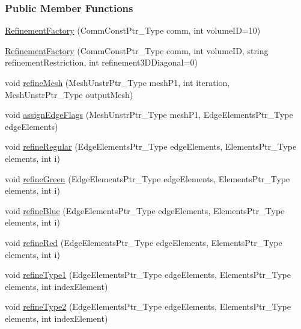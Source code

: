 \subsubsection*{Public Member Functions}
\begin{DoxyCompactItemize}
\item 
\hyperlink{classFEDD_1_1RefinementFactory_a3f60708ffc7693357aa56cf5717c1127}{Refinement\+Factory} (Comm\+Const\+Ptr\+\_\+\+Type comm, int volume\+ID=10)
\item 
\hyperlink{classFEDD_1_1RefinementFactory_a5207ece9582aa02b221b48b89cddfab9}{Refinement\+Factory} (Comm\+Const\+Ptr\+\_\+\+Type comm, int volume\+ID, string refinement\+Restriction, int refinement3\+D\+Diagonal=0)
\item 
void \hyperlink{classFEDD_1_1RefinementFactory_a974e093ee5ef9989bc496392ad5b3c41}{refine\+Mesh} (Mesh\+Unstr\+Ptr\+\_\+\+Type mesh\+P1, int iteration, Mesh\+Unstr\+Ptr\+\_\+\+Type output\+Mesh)
\item 
void \hyperlink{classFEDD_1_1RefinementFactory_aecd11b1eb2352b22948e1440e3b969d2}{assign\+Edge\+Flags} (Mesh\+Unstr\+Ptr\+\_\+\+Type mesh\+P1, Edge\+Elements\+Ptr\+\_\+\+Type edge\+Elements)
\item 
void \hyperlink{classFEDD_1_1RefinementFactory_a34555e97248bb30957744deed34ef317}{refine\+Regular} (Edge\+Elements\+Ptr\+\_\+\+Type edge\+Elements, Elements\+Ptr\+\_\+\+Type elements, int i)
\item 
void \hyperlink{classFEDD_1_1RefinementFactory_a96a9486491ea7d16bfbfaaa5849f794c}{refine\+Green} (Edge\+Elements\+Ptr\+\_\+\+Type edge\+Elements, Elements\+Ptr\+\_\+\+Type elements, int i)
\item 
void \hyperlink{classFEDD_1_1RefinementFactory_a07319ad66d1bcce639f74e12524cfb93}{refine\+Blue} (Edge\+Elements\+Ptr\+\_\+\+Type edge\+Elements, Elements\+Ptr\+\_\+\+Type elements, int i)
\item 
void \hyperlink{classFEDD_1_1RefinementFactory_a0a7da256870f3d9ccdd7801a1ce06a46}{refine\+Red} (Edge\+Elements\+Ptr\+\_\+\+Type edge\+Elements, Elements\+Ptr\+\_\+\+Type elements, int i)
\item 
void \hyperlink{classFEDD_1_1RefinementFactory_ad6cec217483b91da00bf36d35b05e312}{refine\+Type1} (Edge\+Elements\+Ptr\+\_\+\+Type edge\+Elements, Elements\+Ptr\+\_\+\+Type elements, int index\+Element)
\item 
void \hyperlink{classFEDD_1_1RefinementFactory_a3d2675c0ef3f45d58c0b69cbc977b175}{refine\+Type2} (Edge\+Elements\+Ptr\+\_\+\+Type edge\+Elements, Elements\+Ptr\+\_\+\+Type elements, int index\+Element)

\end{DoxyCompactItemize}
